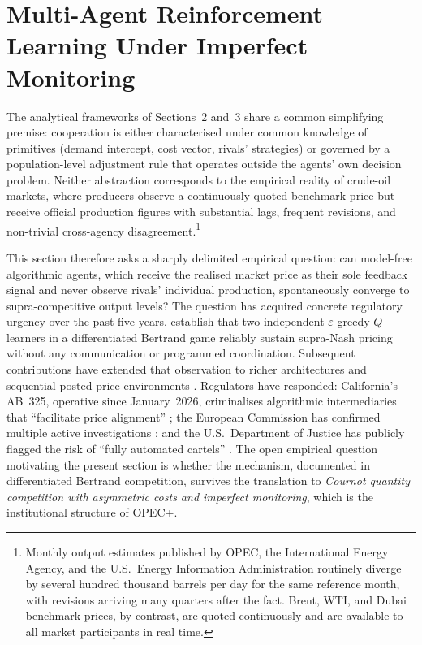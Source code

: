 \setcounter{section}{3}

\section{Multi-Agent Reinforcement Learning Under Imperfect Monitoring}
\label{sec:marl}

The analytical frameworks of Sections~2 and~3 share a common
simplifying premise: cooperation is either characterised under
common knowledge of primitives (demand intercept, cost vector,
rivals' strategies) or governed by a population-level adjustment
rule that operates outside the agents' own decision problem.
Neither abstraction corresponds to the empirical reality of
crude-oil markets, where producers observe a continuously quoted
benchmark price but receive official production figures with
substantial lags, frequent revisions, and non-trivial cross-agency
disagreement.\footnote{Monthly output estimates published by OPEC,
the International Energy Agency, and the U.S.\ Energy Information
Administration routinely diverge by several hundred thousand barrels
per day for the same reference month, with revisions arriving many
quarters after the fact. Brent, WTI, and Dubai benchmark prices,
by contrast, are quoted continuously and are available to all market
participants in real time.}

This section therefore asks a sharply delimited empirical question:
can model-free algorithmic agents, which receive the
realised market price as their sole feedback signal and never
observe rivals' individual production, spontaneously converge to
supra-competitive output levels? The question has acquired concrete
regulatory urgency over the past five years. \citet{calvano2020}
establish that two independent $\varepsilon$-greedy $Q$-learners
in a differentiated Bertrand game reliably sustain supra-Nash
pricing without any communication or programmed coordination.
Subsequent contributions have extended that observation to richer
architectures and sequential posted-price environments
\citep{klein2021, asker2022, banchio2023}. Regulators have
responded: California's AB~325, operative since January~2026,
criminalises algorithmic intermediaries that ``facilitate price
alignment'' \citep{dlapiper2025}; the European Commission has
confirmed multiple active investigations \citep{nortonrose2025,loyensloeff2026};
and the U.S.\ Department of Justice has publicly flagged the risk
of ``fully automated cartels'' \citep{kavanagh2025}. The open
empirical question motivating the present section is whether the
\citeauthor{calvano2020} mechanism, documented in differentiated
Bertrand competition, survives the translation to \emph{Cournot
quantity competition with asymmetric costs and imperfect
monitoring}, which is the institutional structure of OPEC+.

